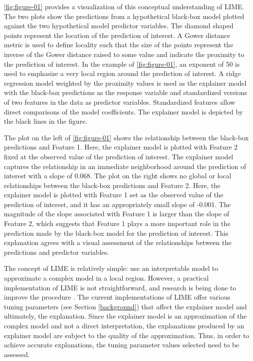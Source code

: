 \documentclass[AMS,STIX2COL]{WileyNJD-v2}\usepackage[]{graphicx}\usepackage[]{color}
\begin{document}
\autoref{fig:figure-01} provides a visualization of this conceptual understanding of LIME. The two plots show the predictions from a hypothetical black-box model plotted against the two hypothetical model predictor variables. The diamond shaped points represent the location of the prediction of interest. A Gower distance metric \citep{gower:1971} is used to define locality such that the size of the points represent the inverse of the Gower distance raised to some value and indicate the proximity to the prediction of interest. In the example of \autoref{fig:figure-01}, an exponent of 50 is used to emphasize a very local region around the prediction of interest. A ridge regression model weighted by the proximity values is used as the explainer model with the black-box predictions as the response variable and standardized versions of two features in the data as predictor variables. Standardized features allow direct comparisons of the model coefficients. The explainer model is depicted by the black lines in the figure.

The plot on the left of \autoref{fig:figure-01} shows the relationship between the black-box predictions and Feature 1. Here, the explainer model is plotted with Feature 2 fixed at the observed value of the prediction of interest. The explainer model captures the relationship in an  immediate neighborhood around the prediction of interest with a slope of 0.068. The plot on the right shows no global or local relationships between the black-box predictions and Feature 2. Here, the explainer model is plotted with Feature 1 set as the observed value of the prediction of interest, and it has an appropriately small slope of -0.001. The magnitude of the slope associated with Feature 1 is larger than the slope of Feature 2, which suggests that Feature 1 plays a more important role in the prediction made by the black-box model for the prediction of interest. This explanation agrees with a visual assessment of the relationships between the predictions and predictor variables.

The concept of LIME is relatively simple: use an interpretable model to approximate a complex model in a local region. However, a practical implementation of LIME is not straightforward, and research is being done to improve the procedure \citep{laugel:2018}. The current implementations of LIME \citep{ribeiro:2020} \citep{pedersen:2020} offer various tuning parameters (see Section \ref{background}) that affect the explainer model and ultimately, the explanation. Since the explainer model is an approximation of the complex model and not a direct interpretation, the explanations produced by an explainer model are subject to the quality of the approximation. Thus, in order to achieve accurate explanations, the tuning parameter values selected need to be assessed. 
\end{document}
